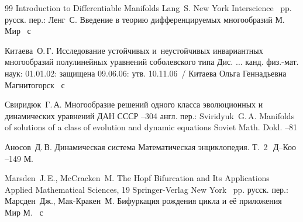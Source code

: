 \begin{thebibliography}{99}
\book Introduction to Differentiable Manifolds
\by Lang~S.
\publaddr New York
\publ Interscience
~pp.
\rtransl
русск. пер.:
\by Ленг~С.
\book Введение в теорию дифференцируемых многообразий
\publaddr М.
\publ Мир
~с

\by Китаева~О.\,Г.
\book Исследование устойчивых и~неустойчивых инвариантных многообразий полулинейных уравнений соболевского типа
\bookinfo Дис. $\ldots$ канд. физ.-мат. наук: 01.01.02: защищена 09.06.06: утв. 10.11.06~/ Китаева Ольга Геннадьевна
\publaddr Магнитогорск
~с

\by Свиридюк~Г.\,А.
\paper Многообразие решений одного класса эволюционных и динамических уравнений
\jour ДАН СССР
--304
\transl
англ. пер.:
\by Sviridyuk~G.\,A.
\paper Manifolds of solutions of a class of evolution and dynamic equations
\jour Soviet Math. Dokl.
--81

\by Аносов~Д.\,В.
\paper Динамическая система
\serial Математическая энциклопедия. Т.~2\,\, Д--Коо
--149
\publaddr М.



\by Marsden~J.\,E., McCracken~M.
\paper The Hopf Bifurcation and Its Applications
\serial Applied Mathematical Sciences, 19 
\publ Springer-Verlag
\publaddr New York
~pp.
\rtransl
русск. пер.:
\by Марсден~Дж.,  Мак-Кракен~М.
\book Бифуркация рождения цикла и её приложения
\publ Мир
\publaddr М.
~с

\end{thebibliography}


\newpage


\makeengtitlem

%

%